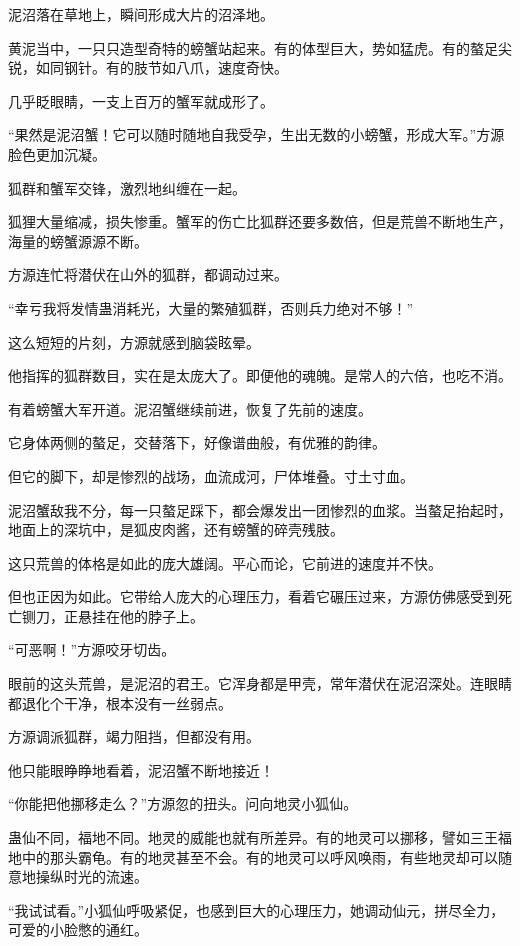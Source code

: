 \begin{this_body}
泥沼落在草地上，瞬间形成大片的沼泽地。

黄泥当中，一只只造型奇特的螃蟹站起来。有的体型巨大，势如猛虎。有的螯足尖锐，如同钢针。有的肢节如八爪，速度奇快。

几乎眨眼睛，一支上百万的蟹军就成形了。

“果然是泥沼蟹！它可以随时随地自我受孕，生出无数的小螃蟹，形成大军。”方源脸色更加沉凝。

狐群和蟹军交锋，激烈地纠缠在一起。

狐狸大量缩减，损失惨重。蟹军的伤亡比狐群还要多数倍，但是荒兽不断地生产，海量的螃蟹源源不断。

方源连忙将潜伏在山外的狐群，都调动过来。

“幸亏我将发情蛊消耗光，大量的繁殖狐群，否则兵力绝对不够！”

这么短短的片刻，方源就感到脑袋眩晕。

他指挥的狐群数目，实在是太庞大了。即便他的魂魄。是常人的六倍，也吃不消。

有着螃蟹大军开道。泥沼蟹继续前进，恢复了先前的速度。

它身体两侧的螯足，交替落下，好像谱曲般，有优雅的韵律。

但它的脚下，却是惨烈的战场，血流成河，尸体堆叠。寸土寸血。

泥沼蟹敌我不分，每一只螯足踩下，都会爆发出一团惨烈的血浆。当螯足抬起时，地面上的深坑中，是狐皮肉酱，还有螃蟹的碎壳残肢。

这只荒兽的体格是如此的庞大雄阔。平心而论，它前进的速度并不快。

但也正因为如此。它带给人庞大的心理压力，看着它碾压过来，方源仿佛感受到死亡铡刀，正悬挂在他的脖子上。

“可恶啊！”方源咬牙切齿。

眼前的这头荒兽，是泥沼的君王。它浑身都是甲壳，常年潜伏在泥沼深处。连眼睛都退化个干净，根本没有一丝弱点。

方源调派狐群，竭力阻挡，但都没有用。

他只能眼睁睁地看着，泥沼蟹不断地接近！

“你能把他挪移走么？”方源忽的扭头。问向地灵小狐仙。

蛊仙不同，福地不同。地灵的威能也就有所差异。有的地灵可以挪移，譬如三王福地中的那头霸龟。有的地灵甚至不会。有的地灵可以呼风唤雨，有些地灵却可以随意地操纵时光的流速。

“我试试看。”小狐仙呼吸紧促，也感到巨大的心理压力，她调动仙元，拼尽全力，可爱的小脸憋的通红。


\end{this_body}
